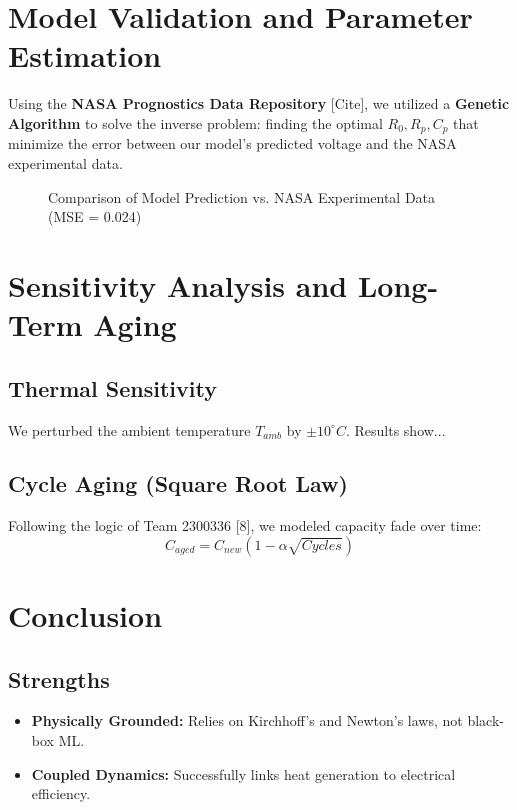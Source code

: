 \documentclass[12pt]{article}
\begin{document}
\section{Model Validation and Parameter Estimation}
Using the \textbf{NASA Prognostics Data Repository} [Cite], we utilized a \textbf{Genetic Algorithm} to solve the inverse problem: finding the optimal $R_0, R_p, C_p$ that minimize the error between our model's predicted voltage and the NASA experimental data.

\begin{figure}[H]
    \centering
    \caption{Comparison of Model Prediction vs. NASA Experimental Data (MSE = 0.024)}
\end{figure}

\section{Sensitivity Analysis and Long-Term Aging}
\subsection{Thermal Sensitivity}
We perturbed the ambient temperature $T_{amb}$ by $\pm 10^{\circ}C$. Results show...

\subsection{Cycle Aging (Square Root Law)}
Following the logic of Team 2300336 [8], we modeled capacity fade over time:
\begin{equation}
    C_{aged} = C_{new} (1 - \alpha \sqrt{Cycles})
\end{equation}

\section{Conclusion}
\subsection{Strengths}
\begin{itemize}
    \item \textbf{Physically Grounded:} Relies on Kirchhoff’s and Newton’s laws, not black-box ML.
    \item \textbf{Coupled Dynamics:} Successfully links heat generation to electrical efficiency.
\end{itemize}
\end{document}
